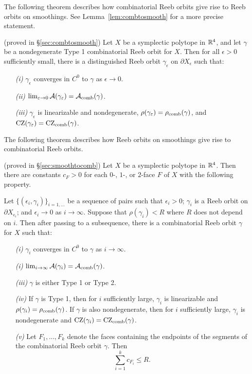 The following theorem describes how combinatorial Reeb orbits give rise to Reeb orbits on smoothings. See Lemma~\ref{lem:combtosmooth} for a more precise statement.

\begin{theorem}
\label{thm:combtosmooth}
(proved in \S\ref{sec:combtosmooth})
Let $X$ be a symplectic polytope in ${\mathbb R}^4$, and let $\gamma$ be a nondegenerate Type 1 combinatorial Reeb orbit for $X$. Then for all $\epsilon>0$ sufficiently small, there is a distinguished Reeb orbit $\gamma_\epsilon$ on $\partial X_\epsilon$ such that:
\begin{itemize}
	\item[\emph{(i)}] $\gamma_\epsilon$ converges in $C^0$ to $\gamma$ as $\epsilon\to0$.
	\item[\emph{(ii)}] $\lim_{\varepsilon\to 0}{\mathcal A}(\gamma_\varepsilon) = {\mathcal A}_{\operatorname{comb}}(\gamma)$.
	\item[\emph{(iii)}] $\gamma_\epsilon$ is linearizable and nondegenerate, $\rho(\gamma_\varepsilon) = \rho_{\operatorname{comb}}(\gamma)$, and $\operatorname{CZ}(\gamma_\varepsilon) = \operatorname{CZ}_{\operatorname{comb}}(\gamma)$.
\end{itemize}
\end{theorem}

The following theorem describes how Reeb orbits on smoothings give rise to combinatorial Reeb orbits.

\begin{theorem}
\label{thm:smoothtocomb}
(proved in \S\ref{sec:smoothtocomb})
Let $X$ be a symplectic polytope in ${\mathbb R}^4$. Then there are constants $c_F>0$ for each $0$-, $1$-, or $2$-face $F$ of $X$ with the following property.

Let $\{(\epsilon_i,\gamma_i)\}_{i=1,\ldots}$ be a sequence of pairs such that $\epsilon_i>0$; $\gamma_i$ is a Reeb orbit on $\partial X_{\epsilon_i}$; and $\epsilon_i\to 0$ as $i\to\infty$. Suppose that $\rho(\gamma_i)<R$ where $R$ does not depend on $i$. Then after passing to a subsequence, there is a combinatorial Reeb orbit $\gamma$ for $X$ such that:
\begin{itemize}
	\item[\emph{(i)}] $\gamma_i$ converges in $C^0$ to $\gamma$ as $i\to\infty$.
    \item[\emph{(i)}] $\lim_{i\to\infty}{\mathcal A}(\gamma_i) = {\mathcal A}_{\operatorname{comb}}(\gamma)$.
    \item[\emph{(iii)}] $\gamma$ is either Type 1 or Type 2.
    \item[\emph{(iv)}] If $\gamma$ is Type 1, then for $i$ sufficiently large, $\gamma_i$ is linearizable and $\rho(\gamma_i) = \rho_{\operatorname{comb}}(\gamma)$. If $\gamma$ is also nondegenerate, then for $i$ sufficiently large, $\gamma_i$ is nondegenerate and $\operatorname{CZ}(\gamma_i) = \operatorname{CZ}_{\operatorname{comb}}(\gamma)$.
    \item[\emph{(v)}] Let $F_1,\ldots,F_k$ denote the faces containing the endpoints of the segments of the combinatorial Reeb orbit $\gamma$. Then
\begin{equation}
\label{eqn:segmentbound}
\sum_{i=1}^kc_{F_i}\le R.
\end{equation}
\end{itemize}
\end{theorem}

